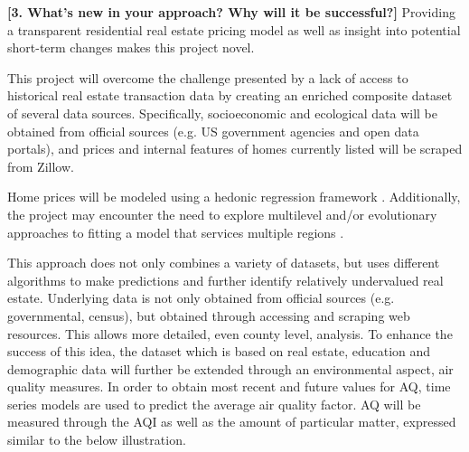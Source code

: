 \documentclass[sigconf,nonacm,11pt]{acmart}
\begin{document}

\textbf{[3. What's new in your approach? Why will it be successful?]}
Providing a transparent residential real estate pricing model \textendash as well as insight into potential short-term changes \textendash makes this project novel. 

This project will overcome the challenge presented by a lack of access to historical real estate transaction data by creating an enriched composite dataset of several data sources. Specifically, socioeconomic and ecological data will be obtained from official sources (e.g. US government agencies and open data portals), and prices and internal features of homes currently listed will be scraped from Zillow.

Home prices will be modeled using a hedonic regression framework \cite{Rosen1974} \cite{Ceh2018} \cite{Bin2004}. Additionally, the project may encounter the need to explore multilevel and/or evolutionary approaches to fitting a model that services multiple regions \cite{Morano2019}.

This approach does not only combines a variety of datasets, but uses different algorithms to make predictions and further identify relatively undervalued real estate. Underlying data is not only obtained from official sources (e.g. governmental, census), but obtained through accessing and scraping web resources. This allows more detailed, even county level, analysis. To enhance the success of this idea, the dataset which is based on real estate, education and demographic data will further be extended through an environmental aspect, air quality measures. In order to obtain most recent and future values for AQ, time series models are used to predict the average air quality factor.
AQ will be measured through the AQI as well as the amount of particular matter, expressed similar to the below illustration.
\end{document}
